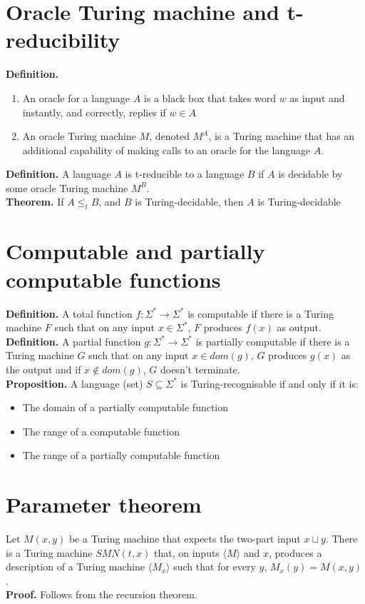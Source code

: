 \documentclass{article}
\begin{document}
\section{Oracle Turing machine and t-reducibility}
\textbf{Definition.}
\begin{enumerate}
	\item An oracle for a language $A$ is a black box that takes word $w$ as input and instantly, and correctly, replies if $w \in A$
	\item An oracle Turing machine $M$, denoted $M^A$, is a Turing machine that has an additional capability of making calls to an oracle for the language $A$.
\end{enumerate}
\textbf{Definition.} A language $A$ is t-reducible to a language $B$ if $A$ is decidable by some oracle Turing machine $M^B$.\medskip
\\\textbf{Theorem.} If $A \leq_t B$, and $B$ is Turing-decidable, then $A$ is Turing-decidable

\section{Computable and partially computable functions}
\textbf{Definition.} A total function $f: \Sigma^* \rightarrow \Sigma^*$ is computable if there is a Turing machine $F$ such that on any input $x \in \Sigma^*$, $F$ produces $f(x)$ as output.\medskip
\\\textbf{Definition.} A partial function $g: \Sigma^* \rightarrow \Sigma^*$ is partially computable if there is a Turing machine $G$ such that on any input $x \in dom(g)$, $G$ produces $g(x)$ as the output and if $x \notin dom(g)$, $G$ doesn't terminate.\medskip
\\\textbf{Proposition.} A language (set) $S \subseteq \Sigma^*$ is Turing-recognisable if and only if it is:
\begin{itemize}
	\item The domain of a partially computable function
	\item The range of a computable function
	\item The range of a partially computable function
\end{itemize}

\section{Parameter theorem}
Let $M(x, y)$ be a Turing machine that expects the two-part input $x\sqcup y$. There is a Turing machine $SMN(t, x)$ that, on inputs $\langle M\rangle$ and $x$, produces a description of a Turing machine $\langle M_x\rangle$ such that for every $y$, $M_x(y) = M(x, y)$.
\\\textbf{Proof.} Follows from the recursion theorem.
\end{document}

